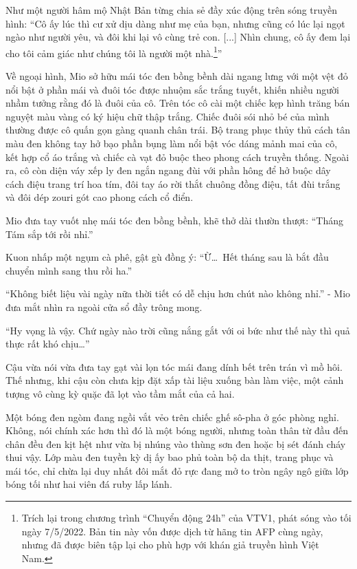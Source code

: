 \documentclass[../main.tex]{subfiles}
\begin{document}
Như một người hâm mộ Nhật Bản từng chia sẻ đầy xúc động trên sóng truyền hình: ``Cô ấy lúc thì cư xử dịu dàng như mẹ của bạn, nhưng cũng có lúc lại ngọt ngào như người yêu, và đôi khi lại vô cùng trẻ con. [...] Nhìn chung, cô ấy đem lại cho tôi cảm giác như chúng tôi là người một nhà.\footnote{Trích lại trong chương trình ``Chuyển động 24h'' của VTV1, phát sóng vào tối ngày 7/5/2022. Bản tin này vốn được dịch từ hãng tin AFP cùng ngày, nhưng đã được biên tập lại cho phù hợp với khán giả truyền hình Việt Nam.}''

Về ngoại hình, Mio sở hữu mái tóc đen bồng bềnh dài ngang lưng với một vệt đỏ nổi bật ở phần mái và đuôi tóc được nhuộm sắc trắng tuyết, khiến nhiều người nhầm tưởng rằng đó là đuôi của cô. Trên tóc cô cài một chiếc kẹp hình trăng bán nguyệt màu vàng có ký hiệu chữ thập trắng. Chiếc đuôi sói nhỏ bé của mình thường được cô quấn gọn gàng quanh chân trái. Bộ trang phục thủy thủ cách tân màu đen không tay hở bạo phần bụng làm nổi bật vóc dáng mảnh mai của cô, kết hợp cổ áo trắng và chiếc cà vạt đỏ buộc theo phong cách truyền thống. Ngoài ra, cô còn diện váy xếp ly đen ngắn ngang đùi với phần hông để hở buộc dây cách điệu trang trí hoa tím, đôi tay áo rời thắt chuông đồng điệu, tất đùi trắng và đôi dép zouri gót cao phong cách cổ điển.

\chrint

Mio đưa tay vuốt nhẹ mái tóc đen bồng bềnh, khẽ thở dài thườn thượt:
``Tháng Tám sắp tới rồi nhỉ.''

Kuon nhấp một ngụm cà phê, gật gù đồng ý:
``Ừ\dots\ Hết tháng sau là bắt đầu chuyển mình sang thu rồi ha.''

``Không biết liệu vài ngày nữa thời tiết có dễ chịu hơn chút nào không nhỉ.'' - Mio đưa mắt nhìn ra ngoài cửa sổ đầy trông mong.

``Hy vọng là vậy. Chứ ngày nào trời cũng nắng gắt với oi bức như thế này thì quả thực rất khó chịu\dots''

Cậu vừa nói vừa đưa tay gạt vài lọn tóc mái đang dính bết trên trán vì mồ hôi. Thế nhưng, khi cậu còn chưa kịp đặt xấp tài liệu xuống bàn làm việc, một cảnh tượng vô cùng kỳ quặc đã lọt vào tầm mắt của cả hai.


Một bóng đen ngòm đang ngồi vắt vẻo trên chiếc ghế sô-pha ở góc phòng nghỉ. Không, nói chính xác hơn thì đó là một bóng người, nhưng toàn thân từ đầu đến chân đều đen kịt hệt như vừa bị nhúng vào thùng sơn đen hoặc bị sét đánh cháy thui vậy. Lớp màu đen tuyền kỳ dị ấy bao phủ toàn bộ da thịt, trang phục và mái tóc, chỉ chừa lại duy nhất đôi mắt đỏ rực đang mở to tròn ngây ngô giữa lớp bóng tối như hai viên đá ruby lấp lánh.
\end{document}
